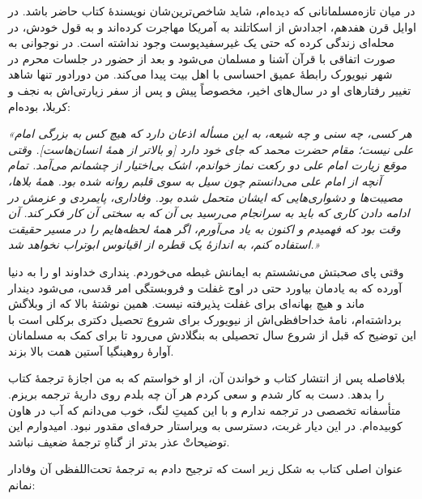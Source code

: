  {
	در میان تازه‌مسلمانانی که دیده‌ام، شاید شاخص‌ترین‌شان نویسندهٔ  کتاب  حاضر باشد.  در اوایل قرن هفدهم، اجدادش از اسکاتلند به آمریکا مهاجرت کرده‌اند و به قول خودش، در محله‌ای زندگی کرده که حتی یک غیرسفید‌پوست وجود نداشته است. در نوجوانی به صورت اتفاقی با قرآن آشنا و مسلمان می‌شود و بعد از حضور در جلسات محرم در شهر نیویورک رابطهٔ عمیق احساسی با اهل بیت {} پیدا می‌کند. من دورادور تنها شاهد تغییر رفتارهای او در سال‌های اخیر، مخصوصاً پیش و پس از سفر زیارتی‌اش به نجف و کربلا، بوده‌ام:
	
	\textit{
		«هر کسی، چه سنی و چه شیعه، به این مسأله اذعان دارد که هیچ کس به بزرگی امام علی{} نیست؛ مقام حضرت محمد{} که جای خود دارد [و بالاتر از همهٔ انسان‌هاست]. وقتی موقع زیارت امام علی{} دو رکعت نماز خواندم، اشک بی‌اختیار از چشمانم می‌آمد.  تمام آنچه از امام علی{} می‌دانستم چون سیل به سوی قلبم روانه شده بود. همهٔ بلاها، مصیبت‌ها و دشواری‌هایی که ایشان متحمل شده بود. وفاداری، پایمردی و عزمش در ادامه دادن کاری که باید به سرانجام می‌رسید بی آن که به سختی آن کار فکر کند. آن وقت بود که فهمیدم و اکنون به یاد می‌آورم، اگر همهٔ لحظه‌هایم را در مسیر حقیقت استفاده کنم، به اندازهٔ یک قطره از اقیانوس ابوتراب{} نخواهد شد.»}
	
	وقتی پای صحبتش می‌نشستم به ایمانش غبطه می‌خوردم. پنداری خداوند او را به دنیا آورده که به یادمان بیاورد حتی در اوج غفلت و فروبستگی امر قدسی، می‌شود دیندار ماند و هیچ بهانه‌ای برای غفلت پذیرفته نیست. همین نوشتهٔ بالا که از وبلاگش برداشته‌ام، نامهٔ خداحافظی‌اش از نیویورک برای شروع تحصیل دکتری برکلی است با این توضیح که قبل از شروع سال تحصیلی به بنگلادش می‌رود تا برای کمک به مسلمانان آوارهٔ روهینگیا آستین همت  بالا بزند.
	
	بلافاصله پس از انتشار کتاب و خواندن آن، از او خواستم که به من اجازهٔ ترجمهٔ کتاب را بدهد. دست به کار شدم و سعی کردم هر آن چه بلدم روی داریهٔ ترجمه بریزم. متأسفانه  تخصصی در ترجمه ندارم و با این کمیتِ لنگ، خوب می‌دانم که آب در هاون کوبیده‌ام. در این دیار غربت، دسترسی به ویراستار حرفه‌ای مقدور نبود. امیدوارم این توضیحاتْ عذر بدتر از گناهِ ترجمهٔ ضعیف نباشد. 
	
	عنوان اصلی کتاب به شکل زیر است که ترجیح دادم به ترجمهٔ تحت‌اللفظی آن وفادار نمانم:
	\begin{center}
		{\small		{} }
	\end{center}
	
}

